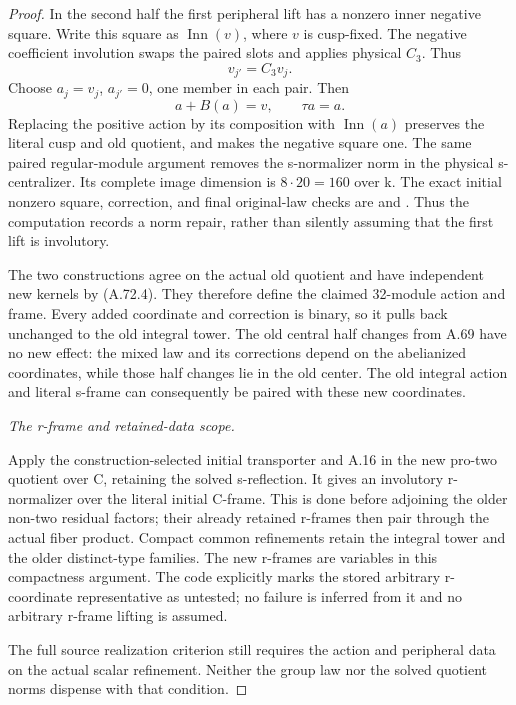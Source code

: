 \begin{proof}
In the second half the first peripheral lift has a nonzero inner
negative square. Write this square as \(\operatorname{Inn}(v)\),
where \(v\) is cusp-fixed. The negative coefficient involution swaps
the paired slots and applies physical \(C_3\). Thus
\[
 v_{j'}=C_3v_j.
\]
Choose \(a_j=v_j\), \(a_{j'}=0\), one member in each pair. Then
\[
 a+B(a)=v,\qquad \tau a=a.
 \tag{A.72.6}
\]
Replacing the positive action by its composition with
\(\operatorname{Inn}(a)\) preserves the literal cusp and old quotient,
and makes the negative square one. The same paired regular-module
argument removes the s-normalizer norm in the physical s-centralizer.
Its complete image dimension is \(8\cdot20=160\) over k. The exact
initial nonzero square, correction, and final original-law checks are
 and
.
Thus the computation records a norm repair, rather than silently
assuming that the first lift is involutory.

The two constructions agree on the actual old quotient and have
independent new kernels by (A.72.4). They therefore define the claimed
32-module action and frame. Every added coordinate and correction is
binary, so it pulls back unchanged to the old integral tower. The old
central half changes from A.69 have no new effect: the mixed law and
its corrections depend on the abelianized coordinates, while those
half changes lie in the old center. The old integral action and
literal s-frame can consequently be paired with these new coordinates.

\emph{The r-frame and retained-data scope.}\par
Apply the construction-selected initial transporter and A.16 in the
new pro-two quotient over C, retaining the solved s-reflection. It
gives an involutory r-normalizer over the literal initial C-frame.
This is done before adjoining the older non-two residual factors;
their already retained r-frames then pair through the actual fiber
product. Compact common refinements retain the integral tower and
the older distinct-type families. The new r-frames are variables in
this compactness argument. The code explicitly marks the stored
arbitrary r-coordinate representative as untested; no failure is
inferred from it and no arbitrary r-frame lifting is assumed.

The full source realization criterion still requires the action and
peripheral data on the actual scalar refinement. Neither the group
law nor the solved quotient norms dispense with that condition.
\end{proof}
